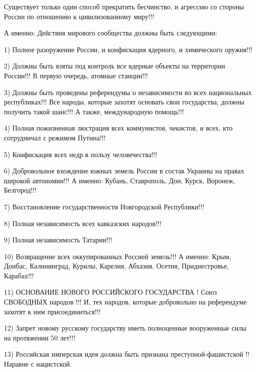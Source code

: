  
 
 
 
 

Существует только один способ прекратить бесчинство, и агрессию со стороны
России по отношению к цивилизованному миру!!! 

А именно: Действия мирового сообщества должны быть следующими:

1) Полное разоружение России, и конфискация ядерного, и химического оружия!!!

2) Должны быть взяты под контроль все ядерные объекты на территории России!!! В первую очередь, атомные станции!!!

3) Должны быть проведены референдумы о независимости во всех национальных
республиках!!! Все народы, которые захотят основать свои государства, должны
получить такой шанс!!! А также, международную помощь!!!

4) Полная пожизненная люстрация всех коммунистов, чекистов, и всех, кто
сотрудничал с режимом Путина!!!

5) Конфискация всех недр в пользу человечества!!!

6) Добровольное вхождение южных земель России в состав Украины на правах
широкой автономии!!! А именно: Кубань, Ставрополь, Дон, Курск, Воронеж,
Белгород!!!

7) Восстановление государственности Новгородской Республики!!!

8) Полная независимость всех кавказских народов!!!

9) Полная независимость Татарии!!!

10) Возвращение всех оккупированных Россией земель!!! А именно: Крым, Донбас,
Калининград, Курилы, Карелия, Абхазия, Осетия, Приднестровье, Карабах!!!

11) ОСНОВАНИЕ НОВОГО РОССИЙСКОГО ГОСУДАРСТВА ! Союз СВОБОДНЫХ народов !!! И,
тех народов, которые добровольно на референдуме захотят к ним присоединиться!!!

12) Запрет новому русскому государству иметь полноценные вооруженные силы на
протяжении 50 лет!!!

13) Российская имперская идея должна быть признана преступной-фашистской
!!Наравне с нацистской.

